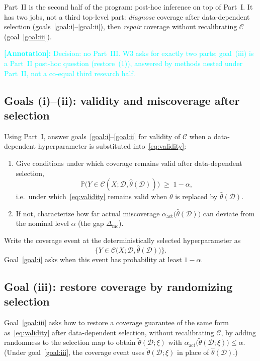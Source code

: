 \documentclass[12pt]{article}
\theoremstyle{plain}
\newcommand{\annote}[1]{\textcolor{cyan}{\textbf{[Annotation]:} #1}}
\begin{document}
Part~II is the second half of the program: post-hoc inference on top of Part~I.
It has two jobs, not a third top-level part: \emph{diagnose} coverage after data-dependent selection (goals~\ref{goal:i}--\ref{goal:ii}), then \emph{repair} coverage without recalibrating $\mathcal{C}$ (goal~\ref{goal:iii}).

\annote{Decision: no Part~III. W3 asks for exactly two parts; goal~(iii) is a Part~II post-hoc question (restore~(1)), answered by methods nested under Part~II, not a co-equal third research half.}

\subsection{Goals (i)--(ii): validity and miscoverage after selection}
\label{sec:part-ii-ab}

\label{prob:part-ii}
Using Part~I, answer goals~\ref{goal:i}--\ref{goal:ii} for validity of $\mathcal{C}$ when a data-dependent hyperparameter is substituted into~\eqref{eq:validity}:
\begin{enumerate}[leftmargin=*]
  \item[(i)]
        Give conditions under which coverage remains valid after data-dependent selection,
        \[
        \mathbb{P}\bigl(Y\in\mathcal{C}(X;\mathcal{D},\hat\theta(\mathcal{D}))\bigr)
        \;\ge\;
        1-\alpha,
        \]
        i.e.\ under which~\eqref{eq:validity} remains valid when $\theta$ is replaced by $\hat\theta(\mathcal{D})$.
  \item[(ii)]
        If not, characterize how far actual miscoverage $\alpha_{\mathrm{act}}\bigl(\hat\theta(\mathcal{D})\bigr)$ can deviate from the nominal level $\alpha$ (the gap $\Delta_{\mathrm{mc}}$).
\end{enumerate}

\label{def:plugin}
Write the coverage event at the deterministically selected hyperparameter as
\[
\bigl\{ Y\in\mathcal{C}\bigl(X;\mathcal{D},\hat\theta(\mathcal{D})\bigr) \bigr\}.
\]
Goal~\ref{goal:i} asks when this event has probability at least $1-\alpha$.

\subsection{Goal (iii): restore coverage by randomizing selection}
\label{sec:part-ii-c}

Goal~\ref{goal:iii} asks how to restore a coverage guarantee of the same form as~\eqref{eq:validity} after data-dependent selection,
without recalibrating $\mathcal{C}$,
by adding randomness to the selection map to obtain $\widetilde\theta(\mathcal{D};\xi)$
with $\alpha_{\mathrm{act}}\bigl(\widetilde\theta(\mathcal{D};\xi)\bigr)\le\alpha$.
(Under goal~\ref{goal:iii}, the coverage event uses $\widetilde\theta(\mathcal{D};\xi)$ in place of $\hat\theta(\mathcal{D})$.)
\end{document}
